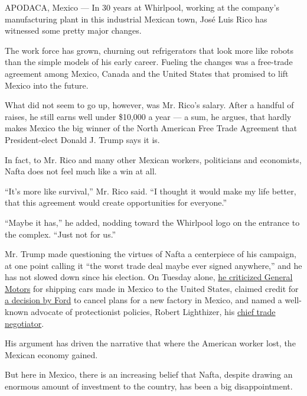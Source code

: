 APODACA, Mexico --- In 30 years at Whirlpool, working at the company's
manufacturing plant in this industrial Mexican town, José Luis Rico has
witnessed some pretty major changes.

The work force has grown, churning out refrigerators that look more like
robots than the simple models of his early career. Fueling the changes
was a free-trade agreement among Mexico, Canada and the United States
that promised to lift Mexico into the future.

What did not seem to go up, however, was Mr. Rico's salary. After a
handful of raises, he still earns well under \$10,000 a year --- a sum,
he argues, that hardly makes Mexico the big winner of the North American
Free Trade Agreement that President-elect Donald J. Trump says it is.

In fact, to Mr. Rico and many other Mexican workers, politicians and
economists, Nafta does not feel much like a win at all.

``It's more like survival,'' Mr. Rico said. ``I thought it would make my
life better, that this agreement would create opportunities for
everyone.''

``Maybe it has,'' he added, nodding toward the Whirlpool logo on the
entrance to the complex. ``Just not for us.''

Mr. Trump made questioning the virtues of Nafta a centerpiece of his
campaign, at one point calling it ``the worst trade deal maybe ever
signed anywhere,'' and he has not slowed down since his election. On
Tuesday alone,
\href{https://twitter.com/realDonaldTrump/status/816260343391514624}{he
criticized General Motors} for shipping cars made in Mexico to the
United States, claimed credit for
\href{https://www.nytimes3xbfgragh.onion/2017/01/03/business/ford-general-motors-trump.html?hp\&action=click\&pgtype=Homepage\&clickSource=story-heading\&module=first-column-region\&region=top-news\&WT.nav=top-news}{a
decision by Ford} to cancel plans for a new factory in Mexico, and named
a well-known advocate of protectionist policies, Robert Lighthizer, his
\href{https://www.nytimes3xbfgragh.onion/2017/01/03/us/politics/trump-robert-lighthizer-trade-mexico.html}{chief
trade negotiator}.

His argument has driven the narrative that where the American worker
lost, the Mexican economy gained.

But here in Mexico, there is an increasing belief that Nafta, despite
drawing an enormous amount of investment to the country, has been a big
disappointment.

